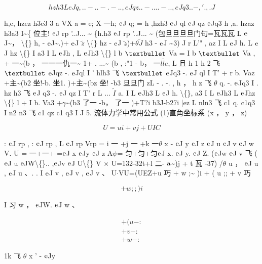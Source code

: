 \[hzh3 LeJq, ..-..-.-.. , eJqz ..-....-.. , eJq3 ..-,'.,. J\]

h,e, hzez h3e3 3 a VX a = e; X 一h; ${\rm e}$J q; = h ,hzh3 ${\rm e}$J ql ${\rm e}$J qz ${\rm e}$Jq3 h ,a. hzaz h3a3 I\textasciitilde{}\{ 位主! ${\rm e}$J rp '..J... \textasciitilde{} \{h.h3 ${\rm e}$J rp '..J... \textasciitilde{} (包旦旦旦旦门句=瓦瓦瓦 L ${\rm e}$J\textasciitilde{}， \textbackslash\{\} h, - ${\rm e}$J\textasciitilde{}.)+ ${\rm e}$J $\tilde{z}$ \textbackslash\{\} hz - ${\rm e}$J $\tilde{z}$)+$\theta$$\tilde{J}$ h3 - ${\rm e}$J \textasciitilde{}3) J r L'" , az I L ${\rm e}$J h. L ${\rm e}$J hz \textbackslash\{\} I a3 I L ${\rm e}$Jh , L ${\rm e}$Jh3 \textbackslash\{\} l b ${\rm •}$ Va = I b ${\rm •}$ Va , + 一\textasciitilde{}(b ， 一一一仇一\textasciitilde{} 1+ . ...\textasciitilde{} (b , :"1 - b， 一$\tilde{lle}$, L 且 h 1 h 2 飞 ${\rm •}$ ${\rm e}$Jqz -. ${\rm e}$Jql I ' hlh3 飞 ${\rm •}$ ${\rm e}$Jq3 -. ${\rm e}$J ql I T' + r b. Vaz +主\textasciitilde{}(b2 坐!-b. 坐1. )+主\textasciitilde{}(bz 坐! -b3 旦旦门 zL - . -. , h ， h z 飞 $\theta$ q. -. ${\rm e}$Jq3 I . hz h3 飞 ${\rm e}$J q3 -. ${\rm e}$J qz I T' r L ... $\tilde{I}$ a. I L ${\rm e}$Jh3 L ${\rm e}$J h. \textbackslash\{\}, a3 I L ${\rm e}$Jh3 L ${\rm e}$Jhz \textbackslash\{\} l + I b. Va3 +$\gamma$\textasciitilde{}(b3 了一 -b， 了一 )+T?i b3J-b27i |ez L nln3 飞 c1 q. c1q3 I n2 n3 飞 c1 qz c1 q3 I J 5. 流体力学中常用公式 (1)直角坐标系 (x ， y ， z)

\[U = ui + vj + UIC\]

: ${\rm e}$J rp , : ${\rm e}$J rp , L ${\rm e}$J rp Vrp = i 一 +j 一 +k 一$\theta$ x - ${\rm e}$J y ${\rm e}$J z ${\rm e}$J u ${\rm e}$J v ${\rm e}$J w V. U = 一+一+-=${\rm e}$J x ${\rm e}$Jy ${\rm e}$J z A$\psi$= 匀+匀+匀${\rm e}$J x. ${\rm e}$J y. ${\rm e}$J Z. (${\rm e}$Jw ${\rm e}$J v 飞 (${\rm e}$J u ${\rm e}$JW\textbackslash\{\}.. ,${\rm e}$Jv ${\rm e}$J U\textbackslash\{\} V $\times $ U=132-32t+l 二- ${\rm a}$\textasciitilde{})j + t 瓦 -37) /$\theta$ u ， ${\rm e}$J u , ${\rm e}$J u 、. . I ${\rm e}$J v , ${\rm e}$J v , ${\rm e}$J v 、 U$\cdot $VU=(UEZ+u 巧 + w ;\textasciitilde{} )i + ( u ;; + v 巧

\[+w ;;)i\]

I 习 w ， ${\rm e}$JW. ${\rm e}$J w 、

\begin{gather*}
+ ( u -:\\
+ v -:\\
+ w -:
\end{gather*}

1k 飞 $\theta$ x ' - ${\rm e}$Jy

